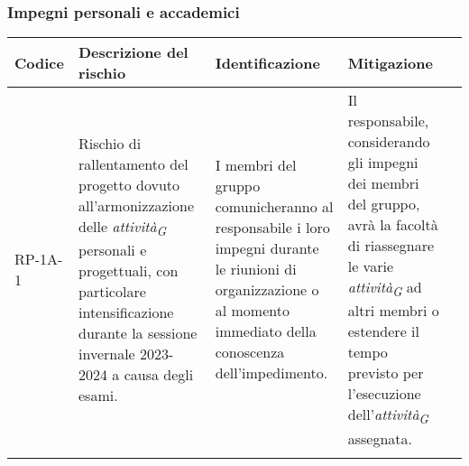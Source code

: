 \subsubsection{Impegni personali e accademici}\label{sec:ImpPersonali}
\begin{table}[H]
    \centering
    \begin{tabularx}{\textwidth}{l>{\RaggedRight}X>{\RaggedRight}X>{\RaggedRight}X>{\RaggedRight}X}
    \toprule
    \rowcolor{gray!50}
    \textbf{Codice} & \textbf{Descrizione del rischio} & \textbf{Identificazione} & \textbf{Mitigazione} \\
    \midrule
    \addlinespace 
    RP-1A-1 & 
    Rischio di rallentamento del progetto dovuto all'armonizzazione delle \textit{attività}\textsubscript{\textit{G}} personali e progettuali, con particolare intensificazione durante la sessione invernale 2023-2024 a causa degli esami. & 
    I membri del gruppo comunicheranno al responsabile i loro impegni durante le riunioni di organizzazione o al momento immediato della conoscenza dell'impedimento. & 
    Il responsabile, considerando gli impegni dei membri del gruppo, avrà la facoltà di riassegnare le varie \textit{attività}\textsubscript{\textit{G}} ad altri membri o estendere il tempo previsto per l'esecuzione dell'\textit{attività}\textsubscript{\textit{G}} assegnata.\\  
    \bottomrule
    \addlinespace 
    \end{tabularx}
\end{table}

\pagebreak